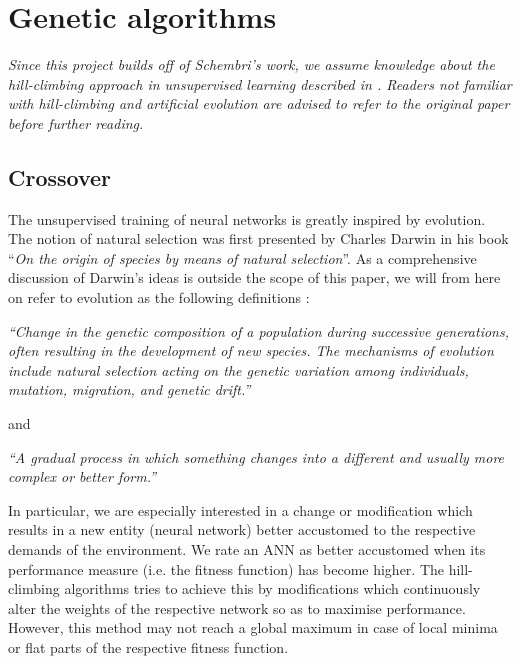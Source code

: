\documentclass[10pt,a4paper,DIV=11]{scrreprt}
\begin{document}
\section{Genetic algorithms}
\textit{Since this project builds off of Schembri's work, we assume knowledge about the hill-climbing approach in unsupervised learning described in \cite{DANIEL}. Readers not
familiar with hill-climbing and artificial evolution are advised to refer to the original paper before further reading.} 

\subsection{Crossover}
The unsupervised training of neural networks is greatly inspired by evolution. The notion of natural selection was first presented by Charles Darwin in his book “\textit{On the origin of species by means of natural selection}”\cite{DARWIN}. 
    As a comprehensive discussion of Darwin's ideas is outside the scope of this paper, we will from here on refer to evolution as the following definitions \cite{OXFORD}:

\begin{center}
\textit{“Change in the genetic composition of a population during successive generations, often resulting in the development of new species. The mechanisms of evolution include natural selection acting on the genetic variation among individuals, mutation, migration, and genetic drift.”}\\
\end{center}

and

\begin{center}
\textit{“A gradual process in which something changes into a different and usually more complex or better form.”}\\ 
\end{center}

In particular, we are especially interested in a change or modification which results in a new entity (neural network) better accustomed to the 
respective demands of the environment.  We rate an ANN as better accustomed when its performance measure (i.e. the fitness function) has become 
higher. The hill-climbing algorithms tries to achieve this by modifications which continuously alter the weights of the respective network so 
as to maximise performance. However, this method may not reach a global maximum in case of local minima or flat parts of the respective fitness 
function.
\end{document}
